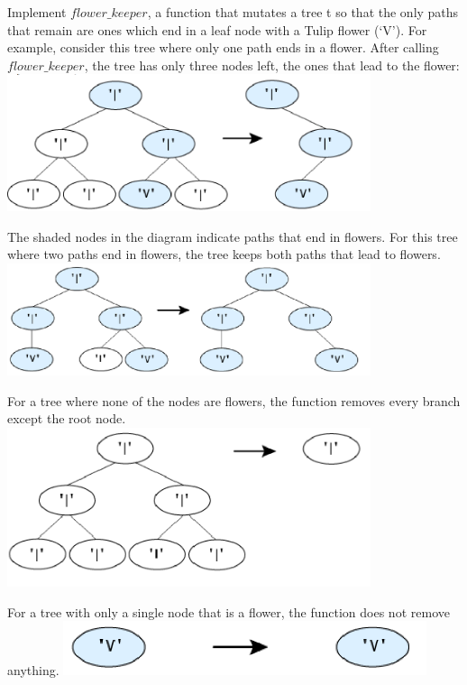 \question Implement $flower\_keeper$, a function that mutates a tree t so that the only paths that remain are ones which
end in a leaf node with a Tulip flower (‘V’).
For example, consider this tree where only one path ends in a flower. After calling $flower\_keeper$, the tree has
only three nodes left, the ones that lead to the flower:
\newline
\includegraphics[width=0.8\textwidth]{three-nodes.png}
\newline
\newline

The shaded nodes in the diagram indicate paths that end in flowers.
For this tree where two paths end in flowers, the tree keeps both paths that lead to flowers.
\newline
\includegraphics[width=0.8\textwidth]{five-nodes.png}
\newline
\newline

For a tree where none of the nodes are flowers, the function removes every branch except the root node.
\newline
\includegraphics[width=0.8\textwidth]{white-root.png}
\newline
\newline

For a tree with only a single node that is a flower, the function does not remove anything.
\newline
\includegraphics[width=0.8\textwidth]{blue-root.png}
\newline
\newline

